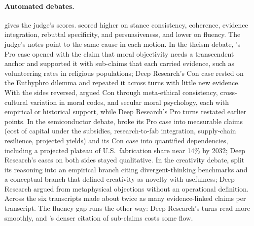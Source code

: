 \paragraph{Automated debates.}
 gives the judge's scores. \sys{} scored higher on stance consistency, coherence, evidence integration, rebuttal specificity, and persuasiveness, and lower on fluency. The judge's notes point to the same cause in each motion. In the theism debate, \sys{}'s Pro case opened with the claim that moral objectivity needs a transcendent anchor and supported it with sub-claims that each carried evidence, such as volunteering rates in religious populations; Deep Research's Con case rested on the Euthyphro dilemma and repeated it across turns with little new evidence. With the sides reversed, \sys{} argued Con through meta-ethical consistency, cross-cultural variation in moral codes, and secular moral psychology, each with empirical or historical support, while Deep Research's Pro turns restated earlier points. In the semiconductor debate, \sys{} broke its Pro case into measurable claims (cost of capital under the subsidies, research-to-fab integration, supply-chain resilience, projected yields) and its Con case into quantified dependencies, including a projected plateau of U.S.\ fabrication share near 14\% by 2032; Deep Research's cases on both sides stayed qualitative. In the creativity debate, \sys{} split its reasoning into an empirical branch citing divergent-thinking benchmarks and a conceptual branch that defined creativity as novelty with usefulness; Deep Research argued from metaphysical objections without an operational definition. Across the six transcripts \sys{} made about twice as many evidence-linked claims per transcript. The fluency gap runs the other way: Deep Research's turns read more smoothly, and \sys{}'s denser citation of sub-claims costs some flow.

